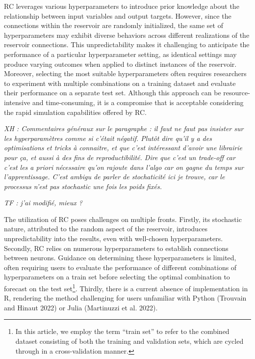 \documentclass[
  11pt,
  a4paper,
]{article}
\theoremstyle{plain}
\theoremstyle{remark}
\begin{document}
RC leverages various hyperparameters to introduce prior knowledge about
the relationship between input variables and output targets. However,
since the connections within the reservoir are randomly initialized, the
same set of hyperparameters may exhibit diverse behaviors across
different realizations of the reservoir connections. This
unpredictability makes it challenging to anticipate the performance of a
particular hyperparameter setting, as identical settings may produce
varying outcomes when applied to distinct instances of the reservoir.
Moreover, selecting the most suitable hyperparameters often requires
researchers to experiment with multiple combinations on a training
dataset and evaluate their performance on a separate test set. Although
this approach can be resource-intensive and time-consuming, it is a
compromise that is acceptable considering the rapid simulation
capabilities offered by RC.

\emph{XH : Commentaires généraux sur le paragraphe : il faut ne faut pas
insister sur les hyperparamètres comme si c'était négatif. Plutôt dire
qu'il y a des optimisations et tricks à connaitre, et que c'est
intéressant d'avoir une librairie pour ça, et aussi à des fins de
reproductibilité. Dire que c'est un trade-off car c'est les a priori
nécessaire qu'on rajoute dans l'algo car on gagne du temps sur
l'apprentissage. C'est ambigu de parler de stochaticité ici je trouve,
car le processus n'est pas stochastic une fois les poids fixés.}

\emph{TF : j'ai modifié, mieux ?}

The utilization of RC poses challenges on multiple fronts. Firstly, its
stochastic nature, attributed to the random aspect of the reservoir,
introduces unpredictability into the results, even with well-chosen
hyperparameters. Secondly, RC relies on numerous hyperparameters to
establish connections between neurons. Guidance on determining these
hyperparameters is limited, often requiring users to evaluate the
performance of different combinations of hyperparameters on a train set
before selecting the optimal combination to forecast on the test
set\footnote{In this article, we employ the term ``train set'' to refer
  to the combined dataset consisting of both the training and validation
  sets, which are cycled through in a cross-validation manner.}.
Thirdly, there is a current absence of implementation in R, rendering
the method challenging for users unfamiliar with Python (Trouvain and
Hinaut 2022) or Julia (Martinuzzi et al. 2022).
\end{document}

